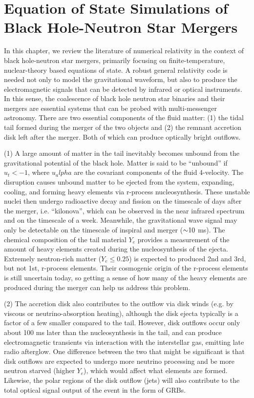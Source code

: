 \chapter{Equation of State Simulations of Black Hole-Neutron Star Mergers}
\label{chap:chapter-4}

In this chapter, we review the literature of numerical relativity in the context of black hole-neutron star mergers, primarily focusing on finite-temperature, nuclear-theory based equations of state.  
A robust general relativity code is needed not only to model the gravitational waveform, but also to produce the electromagnetic signals that can be detected by infrared or optical instruments.  
In this sense, the coalescence of black hole neutron star binaries and their mergers are essential systems that can be probed with multi-messenger astronomy.   
There are two essential components of the fluid matter: (1) the tidal tail formed during the merger of the two objects and (2) the remnant accretion disk left after the merger.  
Both of which can produce optically bright outflows.

(1) A large amount of matter in the tail inevitably becomes unbound from the gravitational potential of the black hole.  Matter is said to be ``unbound'' if $u_t < -1$, where $u_alpha$ are the covariant components of the fluid 4-velocity.  
The disruption causes unbound matter to be ejected from the system, expanding, cooling, and forming heavy elements via r-process nucleosynthesis.
These unstable nuclei then undergo radioactive decay and fission on the timescale of days after the merger, i.e. ``kilonova'', which can be observed in the near infrared spectrum and on the timescale of a week.
Meanwhile, the gravitational wave signal may only be detectable on the timescale of inspiral and merger ($\mathord{\sim}10$ ms).
The chemical composition of the tail material $Y_e$ provides a measurement of the amount of heavy elements created during the nucleosynthesis of the ejecta. 
Extremely neutron-rich matter ($Y_e \le 0.25$) is expected to produced 2nd and 3rd, but not 1st, r-process elements.  
Their cosmogenic origin of the r-process elements is still uncertain today, so getting a sense of how many of the heavy elements are produced during the merger can help us address this problem.
  
(2)  The accretion disk also contributes to the outflow via disk winds (e.g. by viscous or neutrino-absorption heating), although the disk ejecta typically is a factor of a few smaller compared to the tail.
However, disk outflows occur only about 100 ms later than the nucleosynthesis in the tail, and can produce electromagnetic transients via interaction with the interstellar gas, emitting late radio afterglow.
One difference between the two that might be significant is that disk outflows are expected to undergo more neutrino processing and be more neutron starved (higher $Y_e$), which would affect what elements are formed.
Likewise, the polar regions of the disk outflow (jets) will also contribute to the total optical signal output of the event in the form of GRBs.

